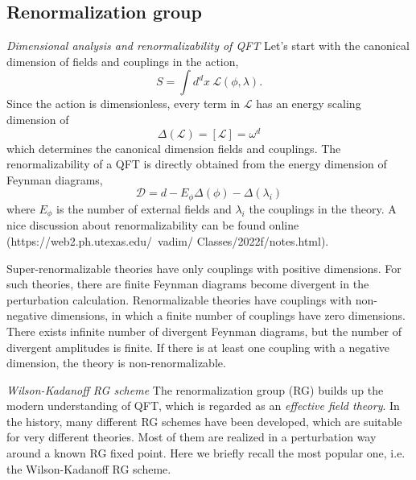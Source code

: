 \documentclass[submission, PhysLectNotes]{SciPost}
\begin{document}
\subsection{Renormalization group}
{\it Dimensional analysis and renormalizability of QFT}
Let's start with the canonical dimension of fields and couplings in the action,
\begin{equation}
    S = \int d^dx \ \mathcal{L}(\phi, \lambda).
\end{equation}
Since the action is dimensionless, every term in $\mathcal{L}$ has an energy scaling dimension of
\begin{equation}
    \Delta(\mathcal{L}) = [\mathcal{L}] = \omega^d
\end{equation}
which determines the canonical dimension fields and couplings. The renormalizability of a QFT is directly obtained from the energy dimension of Feynman diagrams,
\begin{equation}
    \mathcal{D} = d - E_{\phi} \Delta (\phi) - \Delta (\lambda_i)
\end{equation}
where $E_{\phi}$ is the number of external fields and $\lambda_i$ the couplings in the theory. A nice discussion about renormalizability can be found online (https://web2.ph.utexas.edu/~vadim/
Classes/2022f/notes.html).

Super-renormalizable theories have only couplings with positive dimensions. For such theories, there are finite Feynman diagrams become divergent in the perturbation calculation. Renormalizable theories have couplings with non-negative dimensions, in which a finite number of couplings have zero dimensions. There exists infinite number of divergent Feynman diagrams, but the number of divergent amplitudes is finite. If there is at least one coupling with a negative dimension, the theory is non-renormalizable.

{\it Wilson-Kadanoff RG scheme}
The renormalization group (RG) builds up the modern understanding of QFT, which is regarded as an {\it effective field theory}. In the history, many different RG schemes have been developed, which are suitable for very different theories. Most of them are realized in a perturbation way around a known RG fixed point. Here we briefly recall the most popular one, i.e. the Wilson-Kadanoff RG scheme.
\end{document}
